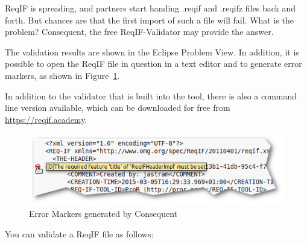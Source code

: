 ReqIF is spreading, and partners start handing .reqif and .reqifz files back and forth.  But chances are that the first import of such a file will fail.  What is the problem? Consequent, the free ReqIF-Validator may provide the answer.

The validation results are shown in the Eclipse Problem View.  In addition, it is possible to open the ReqIF file in question in a text editor and to generate error markers, as shown in Figure~\ref{fig:error-marker}.

\begin{info}
In addition to the validator that is built into the tool, there is also a command line version available, which can be downloaded for free from \url{https://reqif.academy}.
\end{info}

\begin{figure}
\centering     
\includegraphics[width=\linewidth]{../rmf-images/error-marker.png}
\caption{Error Markers generated by Consequent}
\label{fig:error-marker}
\end{figure}

You can validate a ReqIF file as follows:

